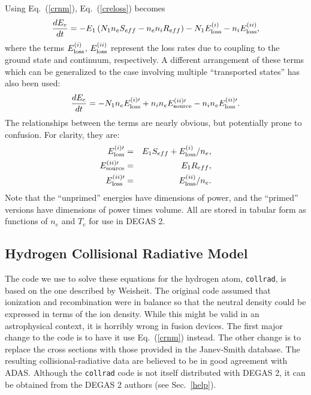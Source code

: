 \documentclass[12pt]{report}
\begin{document}
Using Eq.~(\ref{crnm}), Eq.~(\ref{creloss}) becomes
\begin{equation}
\frac{d E_{e}}{d t} = - E_{1} \left( N_{1} n_{e} S_{eff} - 
n_{e} n_{i} R_{eff}  \right) - N_{1} E_{\rm loss}^{(i)} 
- n_{i} E_{\rm loss}^{(ii)},
\label{eloss}
\end{equation}
where the terms $E_{\rm loss}^{(i)}$, $E_{\rm loss}^{(ii)}$ represent the loss
rates due to coupling to the ground state and continuum, respectively.
A different arrangement of these terms which can be
generalized to the case involving multiple ``transported
states'' has also been used:
\begin{equation}
\frac{d E_{e}}{d t} = - N_{1} n_{e} E_{\rm loss}^{(i)\prime} +
n_{i} n_{e} E_{\rm source}^{(ii)\prime} - n_{i} n_{e} 
E_{\rm loss}^{(ii)\prime}.
\label{elossprime}
\end{equation}
The relationships between the terms are nearly obvious, but 
potentially prone to confusion.  For clarity, they are:
\begin{eqnarray}
E_{\rm loss}^{(i)\prime} & = & E_{1} S_{eff} + E_{\rm loss}^{(i)}
/ n_{e}, \\
E_{\rm source}^{(ii)\prime} & = & E_{1} R_{eff}, \\
E_{\rm loss}^{(ii)\prime} & = & E_{\rm loss}^{(ii)} / n_{e}.
\end{eqnarray}
Note that the ``unprimed'' energies have dimensions of
power, and the ``primed'' versions have dimensions of
power times volume.  All are stored in tabular form
as functions of $n_{e}$ and $T_{e}$ for
use in DEGAS 2.

\subsection{Hydrogen Collisional Radiative Model}
\label{HCR}

The code we use to solve these equations for
the hydrogen atom, {\tt collrad}, 
is based on the one described
by Weisheit\cite{Weis75}. The original
code assumed that ionization and recombination were in balance 
so that the neutral density could be expressed 
in terms of the ion density.  While this might be valid in
an astrophysical context, it is horribly wrong in fusion devices.
The first major change to the code is to have
it use Eq.~(\ref{crnm}) instead. The other
change is to replace the cross sections
with those provided in the Janev-Smith database\cite{Jane93}.
The resulting collisional-radiative data are believed to be
in good agreement with ADAS. Although the {\tt collrad} code is not
itself distributed with DEGAS 2, it can be obtained from the DEGAS 2
authors (see Sec.~\ref{help}).
\end{document}
